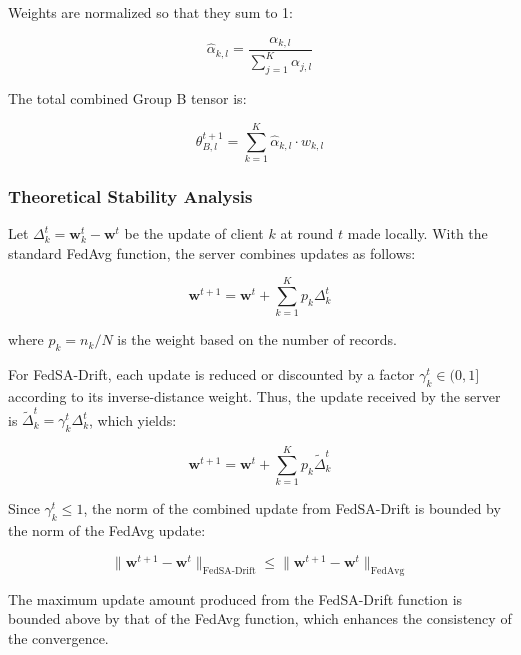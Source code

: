 \documentclass{ieeeaccess}
\newcommand{\sadrift}{FedSA-Drift}
\begin{document}
Weights are normalized so that they sum to 1:

\begin{equation}
\label{eq:norm_weight}
\hat{\alpha}_{k,l} = \frac{\alpha_{k,l}}{\sum_{j=1}^{K} \alpha_{j,l}}
\end{equation}

The total combined Group B tensor is:

\begin{equation}
\label{eq:groupB_agg}
\theta_{B,l}^{t+1} = \sum_{k=1}^{K} \hat{\alpha}_{k,l} \cdot w_{k,l}
\end{equation}

\subsubsection{Theoretical Stability Analysis}

Let $\Delta_k^t = \mathbf{w}_k^t - \mathbf{w}^t$ be the update of client $k$ at round $t$ made locally. With the standard FedAvg function, the server combines updates as follows:

\begin{equation}
\label{eq:fedavg_agg}
\mathbf{w}^{t+1} = \mathbf{w}^t + \sum_{k=1}^{K} p_k \Delta_k^t
\end{equation}

where $p_k = n_k / N$ is the weight based on the number of records.

For \sadrift{}, each update is reduced or discounted by a factor $\gamma_k^t \in (0,1]$ according to its inverse-distance weight. Thus, the update received by the server is $\tilde{\Delta}_k^t = \gamma_k^t \Delta_k^t$, which yields:

\begin{equation}
\label{eq:sadrift_agg}
\mathbf{w}^{t+1} = \mathbf{w}^t + \sum_{k=1}^{K} p_k \tilde{\Delta}_k^t
\end{equation}

Since $\gamma_k^t \le 1$, the norm of the combined update from \sadrift{} is bounded by the norm of the FedAvg update:

\begin{equation}
\label{eq:stability_bound}
\|\mathbf{w}^{t+1} - \mathbf{w}^t\|_{\text{\sadrift{}}}
\le
\|\mathbf{w}^{t+1} - \mathbf{w}^t\|_{\text{FedAvg}}
\end{equation}

The maximum update amount produced from the \sadrift{} function is bounded above by that of the FedAvg function, which enhances the consistency of the convergence.
\end{document}
